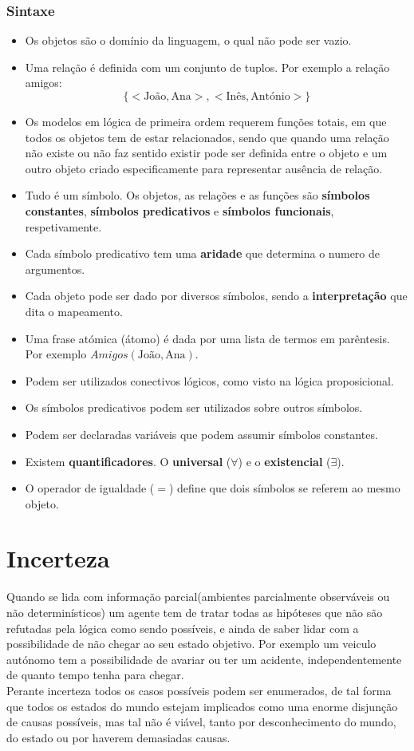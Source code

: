 \documentclass[]{report}
\begin{document}
\subsection{Sintaxe}
\begin{itemize}
\item Os objetos são o domínio da linguagem, o qual não pode ser vazio.
\item Uma relação é definida com um conjunto de tuplos. Por exemplo a relação amigos:
$$\{<\text{João}, \text{Ana}>, <\text{Inês}, \text{António}>\}$$
\item Os modelos em lógica de primeira ordem requerem funções totais, em que todos os objetos tem de estar relacionados, sendo que quando uma relação não existe ou não faz sentido existir pode ser definida entre o objeto e um outro objeto criado especificamente para representar ausência de relação.
\item Tudo é um símbolo. Os objetos, as relações e as funções são \textbf{símbolos constantes}, \textbf{símbolos predicativos} e \textbf{símbolos funcionais}, respetivamente.
\item Cada símbolo predicativo tem uma \textbf{aridade} que determina o numero de argumentos.
\item Cada objeto pode ser dado por diversos símbolos, sendo a \textbf{interpretação} que dita o mapeamento.
\item Uma frase atómica (átomo) é dada por uma lista de termos em parêntesis. Por exemplo $Amigos(\text{João}, \text{Ana})$.
\item Podem ser utilizados conectivos lógicos, como visto na lógica proposicional.
\item Os símbolos predicativos podem ser utilizados sobre outros símbolos.
\item Podem ser declaradas variáveis que podem assumir símbolos constantes.
\item Existem \textbf{quantificadores}. O \textbf{universal} ($\forall$) e o \textbf{existencial} ($\exists$).
\item O operador de igualdade ($=$) define que dois símbolos se referem ao mesmo objeto.
\end{itemize}
\chapter{Incerteza}
Quando se lida com informação parcial(ambientes parcialmente observáveis ou não determinísticos) um agente tem de tratar todas as hipóteses que não são refutadas pela lógica como sendo possíveis, e ainda de saber lidar com a possibilidade de não chegar ao seu estado objetivo. Por exemplo um veiculo autónomo tem a possibilidade de avariar ou ter um acidente, independentemente de quanto tempo tenha para chegar.\\[2mm]
Perante incerteza todos os casos possíveis podem ser enumerados, de tal forma que todos os estados do mundo estejam implicados como uma enorme disjunção de causas possíveis, mas tal não é viável, tanto por desconhecimento do mundo, do estado ou por haverem demasiadas causas.
\end{document}
